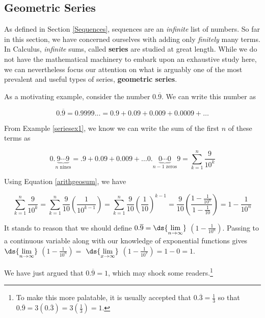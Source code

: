 \documentclass{ximera}
\begin{document}
\subsection{Geometric Series}
\label{GeometricSeries}

As defined in Section \ref{Sequences}, sequences are an \textit{infinite} list of numbers.  So far in this section, we have concerned ourselves with adding only \textit{finitely} many terms.   In Calculus,  \textit{infinite} sums, called \textbf{series} are studied at great length.  While we do not have the mathematical machinery to embark upon an exhaustive study here, we can nevertheless focus our attention on what is arguably one of the most prevalent and useful types of series, \textbf{geometric series}.

As a motivating example, consider the number $0.\overline{9}$.  We can write this number as

\[ 0.\overline{9} = 0.9999... = 0.9 + 0.09 + 0.009 + 0.0009 + \ldots \]


From Example \ref{seriesex1}, we know we can write the sum of the first $n$ of these terms as 

\[ 0.\underbrace{9 \cdots 9}_{\text{$n$ nines}} = .9 + 0.09 + 0.009 + \ldots 0.\!  \underbrace{0 \cdots 0}_{\text{$n-1$ zeros}}  \! 9 = \displaystyle{\sum_{k=1}^{n} \frac{9}{10^{k}}} \]

Using Equation \ref{arithgeosum}, we have


\[\displaystyle{\sum_{k=1}^{n} \frac{9}{10^{k}}} = \sum_{k=1}^{n} \frac{9}{10} \left(\frac{1}{10^{k-1}}\right) = \sum_{k=1}^{n} \frac{9}{10} \left(\frac{1}{10}\right)^{k-1} =  \frac{9}{10} \left( \frac{1 - \frac{1}{10^{n}}}{1 - \frac{1}{10}} \right) = 1 - \frac{1}{10^{n}}   \]

It stands to reason that we should define $0.\overline{9} = \ds{\lim_{n \rightarrow \infty}}$ $\left(1 - \frac{1}{10^{n}}\right)$.  Passing to a continuous variable along with our knowledge of exponential functions  gives  $\ds{\lim_{n \rightarrow \infty}}$ $\left(1 - \frac{1}{10^{n}} \right) =$ $\ds{\lim_{x \rightarrow \infty}}$ $\left(1 - \frac{1}{10^{x}} \right) = 1 - 0 = 1$.

\medskip

We have just argued that $0.\overline{9} = 1$, which may shock some readers.\footnote{To make this more palatable, it is usually accepted that $0.\overline{3} = \frac{1}{3}$ so that $0.\overline{9} = 3\left(0.\overline{3}\right) = 3\left(\frac{1}{3} \right) = 1$.}  
\end{document}
